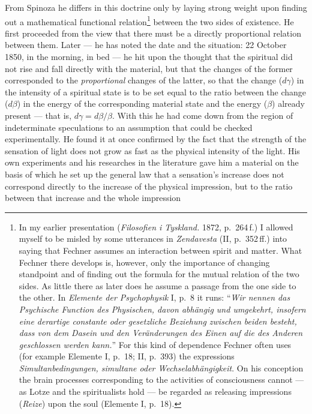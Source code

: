 \documentclass[12pt,a4paper]{book}
\newcommand{\opage}[1]{\marginnote{\footnotesize\textit{[#1]}}}
\begin{document}
From Spinoza he differs in this doctrine only by laying strong weight upon
finding out a mathematical functional relation\footnote{In my earlier
presentation (\textit{Filosofien i Tyskland.} 1872, p.~264\,f.) I allowed myself
to be misled by some utterances in \textit{Zendavesta} (II, p.~352\,ff.) into
saying that Fechner assumes an interaction between spirit and \opage{600}matter. What
Fechner there develops is, however, only the importance of changing standpoint
and of finding out the formula for the mutual relation of the two sides. As
little there as later does he assume a passage from the one side to the other. In
\textit{Elemente der Psychophysik} I, p.~8 it runs: ``\textit{Wir nennen das
Psychische Function des Physischen, davon abhängig und umgekehrt, insofern eine
derartige constante oder gesetzliche Beziehung zwischen beiden besteht, dass von
dem Dasein und den Veränderungen des Einen auf die des Anderen geschlossen werden
kann.}'' For this kind of dependence Fechner often uses (for example Elemente I,
p.~18; II, p.~393) the expressions \textit{Simultanbedingungen, simultane oder
Wechselabhängigkeit}. On his conception the brain processes corresponding to the
activities of consciousness cannot --- as Lotze and the spiritualists hold --- be
regarded as releasing impressions (\textit{Reize}) upon the soul (Elemente I,
p.~18).} between the two sides of existence. He first proceeded from the view
that there must be a directly proportional relation between them. Later --- he
has noted the date and the situation: 22 October 1850, in the morning, in bed ---
he hit upon the thought that the spiritual did not rise and fall directly with
the material, but that the changes of the former corresponded to the
\emph{proportional} changes of the latter, so that the change ($d\gamma$) in the
intensity of a spiritual state is to be set equal to the ratio between the change
($d\beta$) in the energy of the corresponding material state and the energy
($\beta$) already present --- that is, $d\gamma = d\beta/\beta$. With this he had
come down from the region of indeterminate speculations to an assumption that
could be checked experimentally. He found it at once confirmed by the fact that
the strength of the sensation of light does not grow as fast as the physical
intensity of the light. His own experiments and his researches in the literature
gave him a material on the basis of which he set up the general law that a
sensation's increase does not correspond directly to the increase of the physical
impression, but to the ratio between that increase and the whole impression
\end{document}
